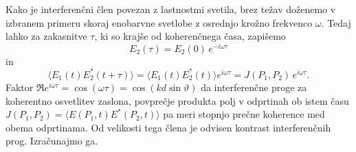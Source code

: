 Kako je interferenčni člen povezan z lastnostmi svetila, brez težav
doženemo v izbranem primeru skoraj enobarvne svetlobe z osrednjo krožno frekvenco
$\omega$. Tedaj lahko za zakasnitve $\tau$, ki so krajše
od koherenčnega časa, zapišemo 
\begin{equation}
E_{2}(\tau)=E_{2}(0)\, e^{-i\omega\tau}
\end{equation}
 in 
\begin{equation}
\langle E_{1}(t)E_{2}^{*}(t+\tau)\rangle=
\langle E_{1}(t)E_{2}^{*}(t)\rangle 
e^{i\omega\tau}=J(P_{1},P_{2})\, e^{i\omega\tau}.
\end{equation}
Faktor $\Re e^{i\omega\tau}= \cos(\omega \tau) = \cos(kd\sin\vartheta)$ da interferenčne
proge za koherentno osvetlitev zaslona, povprečje produkta polj
v odprtinah ob istem času $J(P_{1},P_{2})=\langle E(P_{1},t)E^{*}(P_{2},t)\rangle$
pa meri stopnjo prečne koherence med obema odprtinama. Od velikosti
tega člena je odvisen kontrast interferenčnih prog. Izračunajmo ga.


